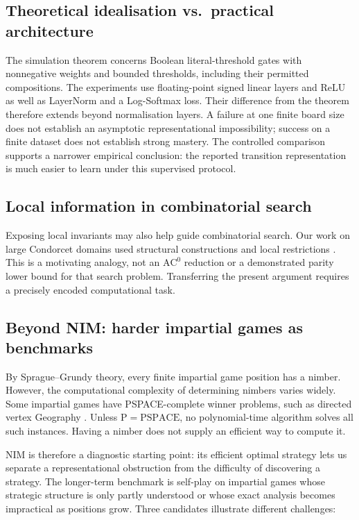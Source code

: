 \documentclass[twoside,11pt]{article}
\newcommand{\AC}{\mathrm{AC}}
\numberwithin{theorem}{section}
\numberwithin{equation}{section}
\begin{document}
\subsection{Theoretical idealisation vs.\ practical architecture}
\label{sec:idealisation}
The simulation theorem concerns Boolean literal-threshold gates with nonnegative weights and bounded thresholds, including their permitted compositions. The experiments use floating-point signed linear layers and ReLU as well as LayerNorm and a Log-Softmax loss. Their difference from the theorem therefore extends beyond normalisation layers.
A failure at one finite board size does not establish an asymptotic representational impossibility; success on a finite dataset does not establish strong mastery. The controlled comparison supports a narrower empirical conclusion: the reported transition representation is much easier to learn under this supervised protocol.

\subsection{Local information in combinatorial search}
\label{sec:math}
Exposing local invariants may also help guide combinatorial search. Our work on large Condorcet domains used structural constructions and local restrictions \citep{karpov2023setalternating,zhou2024cdl,zhou2024phd}. This is a motivating analogy, not an $\AC^0$ reduction or a demonstrated parity lower bound for that search problem. Transferring the present argument requires a precisely encoded computational task.

\subsection{Beyond NIM: harder impartial games as benchmarks}
\label{sec:othergames}

By Sprague--Grundy theory, every finite impartial game position has a nimber. However, the computational complexity of determining nimbers varies widely. Some impartial games have PSPACE-complete winner problems, such as directed vertex Geography \citep{schaefer1978games}. Unless $\mathrm P=\mathrm{PSPACE}$, no polynomial-time algorithm solves all such instances. Having a nimber does not supply an efficient way to compute it.

NIM is therefore a diagnostic starting point: its efficient optimal strategy lets us separate a representational obstruction from the difficulty of discovering a strategy. The longer-term benchmark is self-play on impartial games whose strategic structure is only partly understood or whose exact analysis becomes impractical as positions grow. Three candidates illustrate different challenges:
\end{document}
